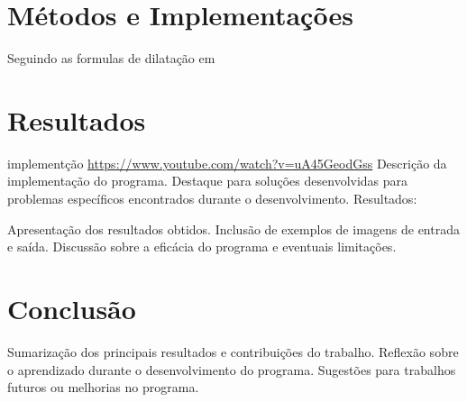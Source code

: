 \documentclass[english, 
               brazil, 
               bsc] %
               {dcomp-abntex2}
\begin{document}


\chapter{Métodos e Implementações}


Seguindo as formulas de dilatação em \cite[capitulo 9]{gonzalez2008digital}

\chapter{Resultados}

implementção \url{https://www.youtube.com/watch?v=uA45GeodGss}
Descrição da implementação do programa.
Destaque para soluções desenvolvidas para problemas específicos encontrados durante o desenvolvimento.
Resultados:

Apresentação dos resultados obtidos.
Inclusão de exemplos de imagens de entrada e saída.
Discussão sobre a eficácia do programa e eventuais limitações.


\chapter{Conclusão}

Sumarização dos principais resultados e contribuições do trabalho.
Reflexão sobre o aprendizado durante o desenvolvimento do programa.
Sugestões para trabalhos futuros ou melhorias no programa.









\postextual


\renewcommand{\chapnumfont}{\chaptitlefont}
\renewcommand{\afterchapternum}{}
% 
% 
\end{document}
